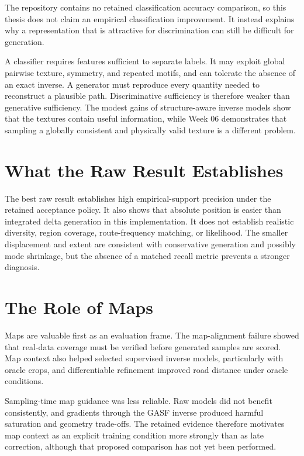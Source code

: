 \documentclass[12pt,a4paper,oneside]{report}
\begin{document}
The repository contains no retained classification accuracy comparison, so this thesis does not claim an empirical classification improvement. It instead explains why a representation that is attractive for discrimination can still be difficult for generation.

A classifier requires features sufficient to separate labels. It may exploit global pairwise texture, symmetry, and repeated motifs, and can tolerate the absence of an exact inverse. A generator must reproduce every quantity needed to reconstruct a plausible path. Discriminative sufficiency is therefore weaker than generative sufficiency. The modest gains of structure-aware inverse models show that the textures contain useful information, while Week 06 demonstrates that sampling a globally consistent and physically valid texture is a different problem.

\section{What the Raw Result Establishes}

The best raw result establishes high empirical-support precision under the retained acceptance policy. It also shows that absolute position is easier than integrated delta generation in this implementation. It does not establish realistic diversity, region coverage, route-frequency matching, or likelihood. The smaller displacement and extent are consistent with conservative generation and possibly mode shrinkage, but the absence of a matched recall metric prevents a stronger diagnosis.

\section{The Role of Maps}

Maps are valuable first as an evaluation frame. The map-alignment failure showed that real-data coverage must be verified before generated samples are scored. Map context also helped selected supervised inverse models, particularly with oracle crops, and differentiable refinement improved road distance under oracle conditions.

Sampling-time map guidance was less reliable. Raw models did not benefit consistently, and gradients through the GASF inverse produced harmful saturation and geometry trade-offs. The retained evidence therefore motivates map context as an explicit training condition more strongly than as late correction, although that proposed comparison has not yet been performed.
\end{document}

